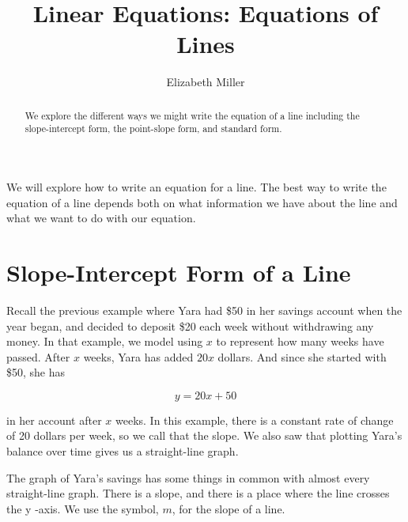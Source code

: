 \documentclass[nooutcomes]{ximera}
\author{Elizabeth Miller}
\title{Linear Equations: Equations of Lines}
\begin{document}
\begin{abstract}
  We explore the different ways we might write the equation of a line including the slope-intercept form, the point-slope form, and standard form.
\end{abstract}
\licenseORCCA
\maketitle

We will explore how to write an equation for a line.  The best way to write the equation of a line depends both on what information we have about the line and what we want to do with our equation.  


\section{Slope-Intercept Form of a Line}

Recall the previous example where Yara had \$50 in her savings account when the year began, and decided to deposit \$20 each week without withdrawing any money. In that example, we model using $x$ to represent how many weeks have passed. After $x$  weeks, Yara has added $20x$ dollars. And since she started with \$50,  she has

$$y=20x+50$$ 

in her account after $x$ weeks. In this example, there is a constant rate of change of 20 dollars per week, so we call that the slope. We also saw that plotting Yara's balance over time gives us a straight-line graph.

\begin{image}
\end{image}

The graph of Yara's savings has some things in common with almost every straight-line graph. There is a slope, and there is a place where the line crosses the 
y
-axis. We use the symbol, $m$, for the slope of a line. 
\end{document}

